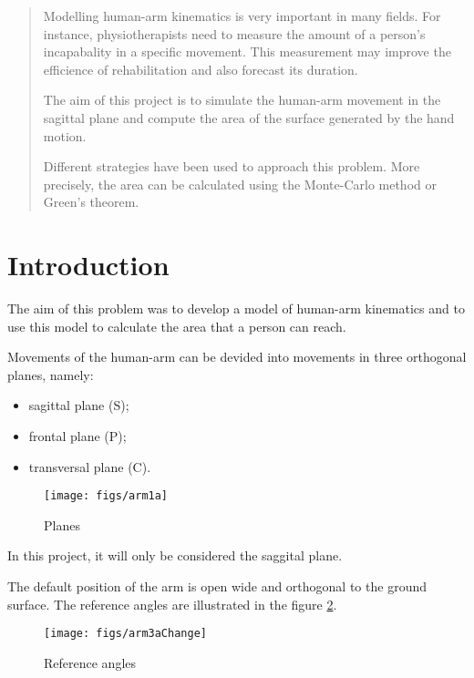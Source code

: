 
\begin{abstract}

Modelling human-arm kinematics is very important in many fields. For instance, physiotherapists need to measure the amount of a person's incapabality in a specific movement. This measurement may improve the efficience of rehabilitation and also forecast its duration. 

The aim of this project is to simulate the human-arm movement in the sagittal plane and compute the area of the surface generated by the hand motion. 

Different strategies have been used to approach this problem. More precisely, the area can be calculated using the Monte-Carlo method or Green's theorem.

\end{abstract}

\section{Introduction}

The aim of this problem was to develop a model of human-arm kinematics and to use this model to calculate the area that a person can reach.

Movements of the human-arm can be devided into movements in three orthogonal planes, namely:

\begin{itemize}
  \item sagittal plane (S);
  \item frontal plane (P);
  \item transversal plane (C).
\end{itemize}

\begin{figure}[!ht]
  \centering
  \texttt{[image: figs/arm1a]}
\caption{Planes \cite{MR2345192}}
\label{fig:bodyarms}
\end{figure}

\noindent In this project, it will only be considered the saggital plane.

The default position of the arm is open wide and orthogonal to the ground surface. The reference angles are illustrated in the figure \ref{fig:bodyarmstwo}.

\begin{figure}[!ht]
  \centering
  \texttt{[image: figs/arm3aChange]}
\caption{Reference angles \cite{MR2345192}}
\label{fig:bodyarmstwo}
\end{figure}

